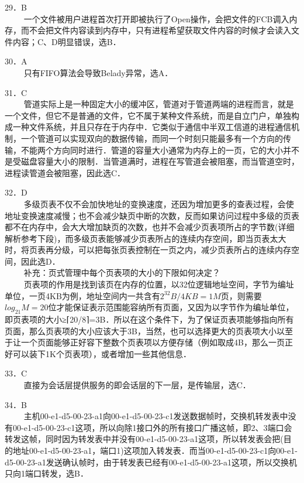 29．B \\
$\qquad$ 一个文件被用户进程首次打开即被执行了Open操作，会把文件的FCB调入内存，而不会把文件内容读到内存中，只有进程希望获取文件内容的时候才会读入文件内容；C、D明显错误，选B．

30．A \\
$\qquad$ 只有FIFO算法会导致Belady异常，选A．

31．C \\
$\qquad$ 管道实际上是一种固定大小的缓冲区，管道对于管道两端的进程而言，就是一个文件，但它不是普通的文件，它不属于某种文件系统，而是自立门户，单独构成一种文件系统，并且只存在于内存中．它类似于通信中半双工信道的进程通信机制，一个管道可以实现双向的数据传输，而同一个时刻只能最多有一个方向的传输，不能两个方向同时进行．管道的容量大小通常为内存上的一页，它的大小并不是受磁盘容量大小的限制．当管道满时，进程在写管道会被阻塞，而当管道空时，进程读管道会被阻塞，因此选C．

32．D \\
$\qquad$ 多级页表不仅不会加快地址的变换速度，还因为增加更多的查表过程，会使地址变换速度减慢；也不会减少缺页中断的次数，反而如果访问过程中多级的页表都不在内存中，会大大增加缺页的次数，也并不会减少页表项所占的字节数(详细解析参考下段)，而多级页表能够减少页表所占的连续内存空间，即当页表太大时，将页表再分级，可以把每张页表控制在一页之内，减少页表所占的连续内存空间，因此选D． \\
$\qquad$ 补充：页式管理中每个页表项的大小的下限如何决定？ \\
$\qquad$ 页表项的作用是找到该页在内存的位置，以32位逻辑地址空间，字节为编址单位，一页4KB为例，地址空间内一共含有$2^{32}B/4KB=1M$页，则需要$log_21M=20$位才能保证表示范围能容纳所有页面，又因为以字节作为编址单位，即页表项的大小≥⌈20/8⌉=3B．所以在这个条件下，为了保证页表项能够指向所有页面，那么页表项的大小应该大于3B，当然，也可以选择更大的页表项大小以至于让一个页面能够正好容下整数个页表项以方便存储（例如取成4B，那么一页正好可以装下1K个页表项），或者增加一些其他信息．

33．C \\
$\qquad$ 直接为会话层提供服务的即会话层的下一层，是传输层，选C．

34．B \\
$\qquad$ 主机00-e1-d5-00-23-a1向00-e1-d5-00-23-c1发送数据帧时，交换机转发表中没有00-e1-d5-00-23-c1这项，所以向除1接口外的所有接口广播这帧，即2、3端口会转发这帧，同时因为转发表中并没有00-e1-d5-00-23-a1这项，所以转发表会把(目的地址00-e1-d5-00-23-a1，端口1)这项加入转发表．而当00-e1-d5-00-23-c1向00-e1-d5-00-23-a1发送确认帧时，由于转发表已经有00-e1-d5-00-23-a1这项，所以交换机只向1端口转发，选B．

